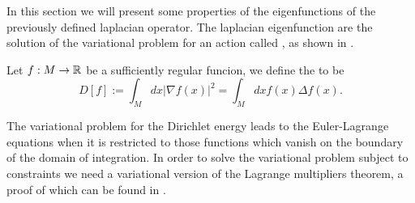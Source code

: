 \documentclass[../2.tex]{subfiles}
\begin{document}
In this section we will present some properties of the eigenfunctions of the previously defined laplacian operator.
The laplacian eigenfunction are the solution of the variational problem for an action called , as shown in \cite{bronstein}.

\begin{defn}
    Let $f:M\to\mathbb{R}$ be a sufficiently regular funcion, we define the  to be
    \[ D[f] := \int_{M} dx |\nabla f(x)|^2 = \int_{M} dx f(x)\Delta f(x) .\]
\end{defn}

The variational problem for the Dirichlet energy leads to the Euler-Lagrange equations when it is restricted to those functions which
vanish on the boundary of the domain of integration. In order to solve the variational problem subject to constraints we need a variational 
version of the Lagrange multipliers theorem, a proof of which can be found in \cite{fomin}.
\end{document}
